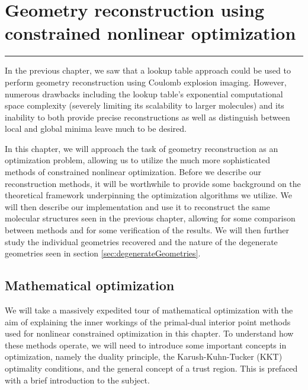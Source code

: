 \chapter{Geometry reconstruction using constrained nonlinear optimization}\label{ch:optimization}

\vspace{-1.5 em}
\begin{addmargin}[-0.5cm]{0cm}
  \minitoc
\end{addmargin}
\hrule
\vspace{1.5 em}

In the previous chapter, we saw that a lookup table approach could be used to perform geometry reconstruction using Coulomb explosion imaging. However, numerous drawbacks including the lookup table's exponential computational space complexity (severely limiting its scalability to larger molecules) and its inability to both provide precise reconstructions as well as distinguish between local and global minima leave much to be desired.

In this chapter, we will approach the task of geometry reconstruction as an optimization problem, allowing us to utilize the much more sophisticated methods of constrained nonlinear optimization. Before we describe our reconstruction methods, it will be worthwhile to provide some background on the theoretical framework underpinning the optimization algorithms we utilize. We will then describe our implementation and use it to reconstruct the same molecular structures seen in the previous chapter, allowing for some comparison between methods and for some verification of the results. We will then further study the individual geometries recovered and the nature of the degenerate geometries seen in section \ref{sec:degenerateGeometries}. %

\section{Mathematical optimization}
We will take a massively expedited tour of mathematical optimization with the aim of explaining the inner workings of the primal-dual interior point methods used for nonlinear constrained optimization in this chapter. To understand how these methods operate, we will need to introduce some important concepts in optimization, namely the duality principle, the Karush-Kuhn-Tucker (KKT) optimality conditions, and the general concept of a trust region. This is prefaced with a brief introduction to the subject.

